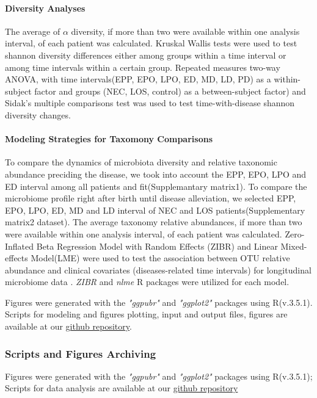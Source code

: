 \documentclass[fleqn,10pt,lineno]{wlpeerj} %
\begin{document}
      \paragraph{Diversity Analyses}
      The average of $\alpha$ diversity, if more than two were available within one analysis interval, of each patient was calculated. Kruskal Wallis tests were used to test shannon diversity differences either among groups within a time interval or among time intervals within a certain group. Repeated measures two-way ANOVA, with time intervals(EPP, EPO, LPO, ED, MD, LD, PD) as a within-subject factor and groups (NEC, LOS, control) as a between-subject factor) and Sidak's multiple comparisons test was used to test time-with-disease shannon diversity changes.
      \paragraph*{Modeling Strategies for Taxomony Comparisons}
      To compare the dynamics of microbiota diversity and relative taxonomic abundance preciding the disease, we took into account the EPP, EPO, LPO and ED interval among all patients and fit(Supplemantary matrix1).
      To compare the microbiome profile right after birth until disease alleviation, we selected EPP, EPO, LPO, ED, MD and LD interval of NEC and LOS patients(Supplementary matrix2 dataset).
      The average taxonomy relative abundances, if more than two were available within one analysis interval, of each patient was calculated.
      Zero-Inflated Beta Regression Model with Random Effects (ZIBR) and Linear Mixed-effects Model(LME) were used to test the association between OTU relative abundance and clinical covariates (diseases-related time intervals) for longitudinal microbiome data \citep{chen2016two}. \textit{ZIBR} and \textit{nlme}\citep{nlme} R packages were utilized for each model.

      \noindent
      Figures were generated with the \textit{"ggpubr"}\citep{kassambara2017ggpubr} and \textit{"ggplot2"}\citep{ggplot2} packages using R(v.3.5.1).
      Scripts for modeling and figures plotting, input and output files, figures are available at our \href{https://github.com/jiayiliujiayi/NEC-LOS-microbiota_pattern_comparison}{github repository}.

    \subsubsection*{Scripts and Figures Archiving}
    Figures were generated with the \textit{"ggpubr"}\citep{kassambara2017ggpubr} and \textit{"ggplot2"}\citep{ggplot2} packages using R(v.3.5.1); Scripts for data analysis are available at our \href{https://github.com/jiayiliujiayi/NEC-LOS-microbiota_pattern_comparison}{github repository}
\end{document}
